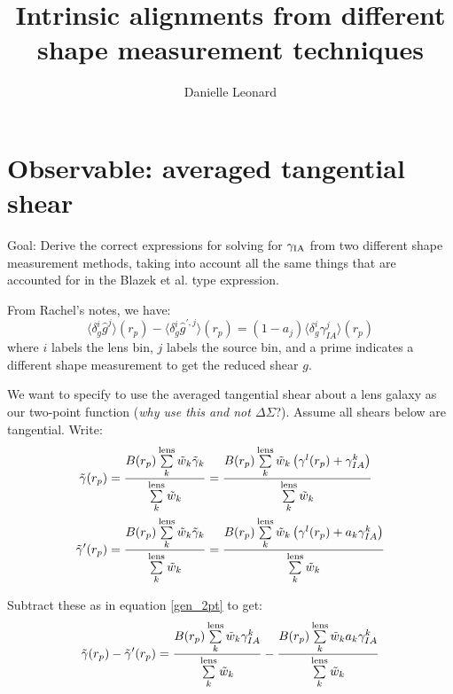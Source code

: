 \documentclass[onecolumn,amsmath,aps,fleqn, superscriptaddress]{revtex4}
\begin{document}
\title{Intrinsic alignments from different shape measurement techniques}

\author{Danielle Leonard}

\maketitle

\section{Observable: averaged tangential shear}

Goal: Derive the correct expressions for solving for $\gamma_{\rm IA}$ from two different shape measurement methods, taking into account all the same things that are accounted for in the Blazek et al. type expression.

From Rachel's notes, we have:
\begin{equation}
\langle \delta_g^i \hat{g}^j\rangle(r_p) - \langle \delta_g^i \hat{g}^{\prime,j}\rangle(r_p) = (1-a_j)\langle \delta_g^i \gamma_{IA}^j\rangle(r_p)
\label{gen_2pt}
\end{equation}
where $i$ labels the lens bin, $j$ labels the source bin, and a prime indicates a different shape measurement to get the reduced shear $g$.

We want to specify to use the averaged tangential shear about a lens galaxy as our two-point function ({\it why use this and not $\Delta \Sigma$}?). Assume all shears below are tangential. Write:
\begin{align}
\tilde{\gamma}(r_p) &= \frac{B(r_p) \sum\limits_{k}^{\rm lens} \tilde{w}_k \tilde{\gamma}_k}{\sum\limits_{k}^{\rm lens} \tilde{w}_k} = \frac{B(r_p) \sum\limits_{k}^{\rm lens} \tilde{w}_k \left(\gamma^l(r_p) + \gamma_{IA}^k\right)}{\sum\limits_{k}^{\rm lens} \tilde{w}_k} \nonumber \\ 
\tilde{\gamma}'(r_p) &= \frac{B(r_p) \sum\limits_{k}^{\rm lens} \tilde{w}_k \tilde{\gamma}_k}{\sum\limits_{k}^{\rm lens} \tilde{w}_k} = \frac{B(r_p) \sum\limits_{k}^{\rm lens} \tilde{w}_k \left(\gamma^l(r_p) + a_k\gamma_{IA}^k\right)}{\sum\limits_{k}^{\rm lens} \tilde{w}_k}
\label{full_both}
\end{align}

Subtract these as in equation \ref{gen_2pt} to get:
\begin{equation}
\tilde{\gamma}(r_p) - \tilde{\gamma}'(r_p) = \frac{B(r_p) \sum\limits_{k}^{\rm lens} \tilde{w}_k \gamma_{IA}^k}{\sum\limits_{k}^{\rm lens} \tilde{w}_k} - \frac{B(r_p) \sum\limits_{k}^{\rm lens} \tilde{w}_k a_k\gamma_{IA}^k}{\sum\limits_{k}^{\rm lens} \tilde{w}_k}
\label{subtract_gammat}
\end{equation}
\end{document}
